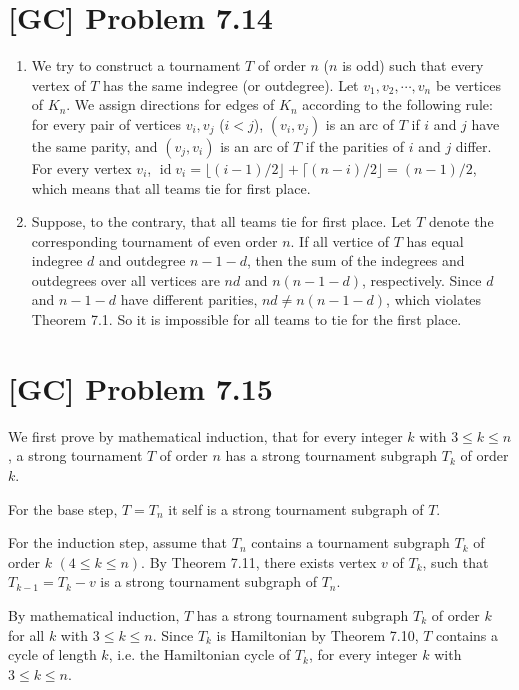 \documentclass[a4paper,11pt,twocolumn]{article}
\newcommand{\id}{\mathop{\mathrm{id}}}
\begin{document}
   \section{[GC] Problem 7.14}
   \begin{enumerate}
   	\item  We try to construct a tournament $T$ of order $n$ ($n$ is odd) such that every vertex of $T$ has the same indegree (or outdegree). Let $v_1, v_2, \cdots, v_n$ be vertices of $K_n$. We assign directions for edges of $K_n$ according to the following rule: for every pair of vertices $v_i, v_j$ ($i < j$), $(v_i, v_j)$ is an arc of $T$ if $i$ and $j$ have the same parity, and $(v_j, v_i)$ is an arc of $T$ if the parities of $i$ and $j$ differ. For every vertex $v_i$, $\id v_i = \lfloor (i-1)/2 \rfloor + \lceil (n-i)/2 \rfloor = (n-1)/2$, which means that all teams tie for first place.
   	\item Suppose, to the contrary, that all teams tie for first place. Let $T$ denote the corresponding tournament of even order $n$. If all vertice of $T$ has equal indegree $d$ and outdegree $n-1-d$, then the sum of the indegrees and outdegrees over all vertices are $nd$ and $n(n-1-d)$, respectively. Since $d$ and $n-1-d$ have different parities, $nd \neq n(n-1-d)$, which violates Theorem 7.1. So it is impossible for all teams to tie for the first place.
   \end{enumerate}
   
   \section{[GC] Problem 7.15}
   We first prove by mathematical induction, that for every integer $k$ with $3 \leq k \leq n$, a strong tournament $T$ of order $n$ has a strong tournament subgraph $T_k$ of order $k$. \par
   For the base step, $T = T_n$ it self is a strong tournament subgraph of $T$. \par 
   For the induction step, assume that $T_n$ contains a tournament subgraph $T_k$ of order $k$ $(4 \leq k \leq n)$. By Theorem 7.11, there exists vertex $v$ of $T_k$, such that $T_{k-1} = T_k - v$ is a strong tournament subgraph of $T_n$. \par 
   By mathematical induction, $T$ has a strong tournament subgraph $T_k$ of order $k$ for all $k$ with $3 \leq k \leq n$. Since $T_k$ is Hamiltonian by Theorem 7.10, $T$ contains a cycle of length $k$, i.e. the Hamiltonian cycle of $T_k$, for every integer $k$ with $3 \leq k \leq n$. 
\end{document}

